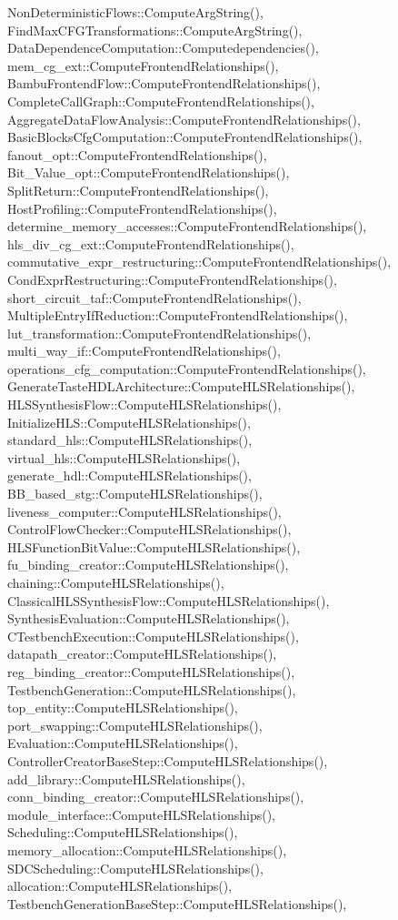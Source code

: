 Non\+Deterministic\+Flows\+::\+Compute\+Arg\+String(), Find\+Max\+C\+F\+G\+Transformations\+::\+Compute\+Arg\+String(), Data\+Dependence\+Computation\+::\+Computedependencies(), mem\+\_\+cg\+\_\+ext\+::\+Compute\+Frontend\+Relationships(), Bambu\+Frontend\+Flow\+::\+Compute\+Frontend\+Relationships(), Complete\+Call\+Graph\+::\+Compute\+Frontend\+Relationships(), Aggregate\+Data\+Flow\+Analysis\+::\+Compute\+Frontend\+Relationships(), Basic\+Blocks\+Cfg\+Computation\+::\+Compute\+Frontend\+Relationships(), fanout\+\_\+opt\+::\+Compute\+Frontend\+Relationships(), Bit\+\_\+\+Value\+\_\+opt\+::\+Compute\+Frontend\+Relationships(), Split\+Return\+::\+Compute\+Frontend\+Relationships(), Host\+Profiling\+::\+Compute\+Frontend\+Relationships(), determine\+\_\+memory\+\_\+accesses\+::\+Compute\+Frontend\+Relationships(), hls\+\_\+div\+\_\+cg\+\_\+ext\+::\+Compute\+Frontend\+Relationships(), commutative\+\_\+expr\+\_\+restructuring\+::\+Compute\+Frontend\+Relationships(), Cond\+Expr\+Restructuring\+::\+Compute\+Frontend\+Relationships(), short\+\_\+circuit\+\_\+taf\+::\+Compute\+Frontend\+Relationships(), Multiple\+Entry\+If\+Reduction\+::\+Compute\+Frontend\+Relationships(), lut\+\_\+transformation\+::\+Compute\+Frontend\+Relationships(), multi\+\_\+way\+\_\+if\+::\+Compute\+Frontend\+Relationships(), operations\+\_\+cfg\+\_\+computation\+::\+Compute\+Frontend\+Relationships(), Generate\+Taste\+H\+D\+L\+Architecture\+::\+Compute\+H\+L\+S\+Relationships(), H\+L\+S\+Synthesis\+Flow\+::\+Compute\+H\+L\+S\+Relationships(), Initialize\+H\+L\+S\+::\+Compute\+H\+L\+S\+Relationships(), standard\+\_\+hls\+::\+Compute\+H\+L\+S\+Relationships(), virtual\+\_\+hls\+::\+Compute\+H\+L\+S\+Relationships(), generate\+\_\+hdl\+::\+Compute\+H\+L\+S\+Relationships(), B\+B\+\_\+based\+\_\+stg\+::\+Compute\+H\+L\+S\+Relationships(), liveness\+\_\+computer\+::\+Compute\+H\+L\+S\+Relationships(), Control\+Flow\+Checker\+::\+Compute\+H\+L\+S\+Relationships(), H\+L\+S\+Function\+Bit\+Value\+::\+Compute\+H\+L\+S\+Relationships(), fu\+\_\+binding\+\_\+creator\+::\+Compute\+H\+L\+S\+Relationships(), chaining\+::\+Compute\+H\+L\+S\+Relationships(), Classical\+H\+L\+S\+Synthesis\+Flow\+::\+Compute\+H\+L\+S\+Relationships(), Synthesis\+Evaluation\+::\+Compute\+H\+L\+S\+Relationships(), C\+Testbench\+Execution\+::\+Compute\+H\+L\+S\+Relationships(), datapath\+\_\+creator\+::\+Compute\+H\+L\+S\+Relationships(), reg\+\_\+binding\+\_\+creator\+::\+Compute\+H\+L\+S\+Relationships(), Testbench\+Generation\+::\+Compute\+H\+L\+S\+Relationships(), top\+\_\+entity\+::\+Compute\+H\+L\+S\+Relationships(), port\+\_\+swapping\+::\+Compute\+H\+L\+S\+Relationships(), Evaluation\+::\+Compute\+H\+L\+S\+Relationships(), Controller\+Creator\+Base\+Step\+::\+Compute\+H\+L\+S\+Relationships(), add\+\_\+library\+::\+Compute\+H\+L\+S\+Relationships(), conn\+\_\+binding\+\_\+creator\+::\+Compute\+H\+L\+S\+Relationships(), module\+\_\+interface\+::\+Compute\+H\+L\+S\+Relationships(), Scheduling\+::\+Compute\+H\+L\+S\+Relationships(), memory\+\_\+allocation\+::\+Compute\+H\+L\+S\+Relationships(), S\+D\+C\+Scheduling\+::\+Compute\+H\+L\+S\+Relationships(), allocation\+::\+Compute\+H\+L\+S\+Relationships(), Testbench\+Generation\+Base\+Step\+::\+Compute\+H\+L\+S\+Relationships(), 